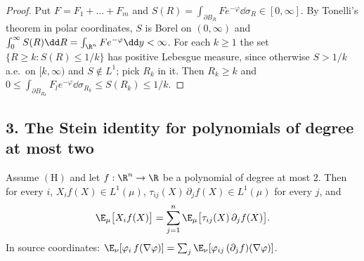 \documentclass[../main.tex]{subfiles}
\begin{document}
\begin{proof}
Put $F=F_1+\dots+F_m$ and $S(R)=\int_{\partial B_R}Fe^{-\varphi}\dd\sigma_R\in[0,\infty]$.
By Tonelli's theorem in polar coordinates, $S$ is Borel on $(0,\infty)$ and
$\int_0^\infty S(R)\dd R=\int_{\R^n}Fe^{-\varphi}\dd y<\infty$.  For each $k\ge1$ the set
$\{R\ge k:S(R)\le1/k\}$ has positive Lebesgue measure, since otherwise $S>1/k$ a.e.\ on
$[k,\infty)$ and $S\notin L^1$; pick $R_k$ in it.  Then $R_k\ge k$ and
$0\le\int_{\partial B_{R_k}}F_le^{-\varphi}\dd\sigma_{R_k}\le S(R_k)\le1/k$.
\end{proof}

\subsection*{3. The Stein identity for polynomials of degree at most two}

\begin{proposition}
\label{prop:sol-lstm-stein}
Assume $(\mathrm H)$ and let $f:\R^n\to\R$ be a polynomial of degree at most $2$.  Then for
every $i$, $X_if(X)\in L^1(\mu)$, $\tau_{ij}(X)\,\partial_jf(X)\in L^1(\mu)$ for every $j$, and
\begin{equation}
  \E_\mu\bigl[X_if(X)\bigr]=\sum_{j=1}^n\E_\mu\bigl[\tau_{ij}(X)\,\partial_jf(X)\bigr] .
  \label{eq:sol-lstm-stein}
\end{equation}
In source coordinates: $\E_\nu[\varphi_i\,f(\nabla\varphi)]=\sum_j\E_\nu[\varphi_{ij}\,(\partial_jf)(\nabla\varphi)]$.
\end{proposition}
\end{document}
